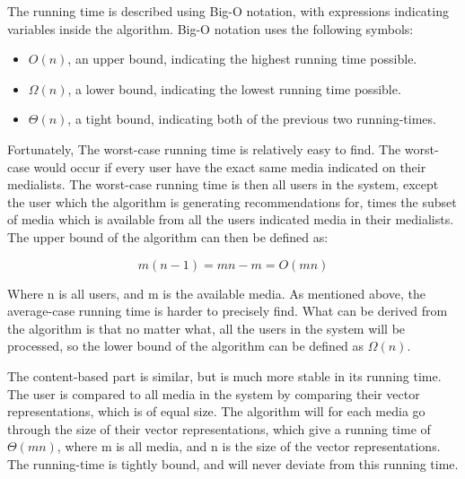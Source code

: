 The running time is described using Big-O notation, with expressions indicating variables inside the algorithm. Big-O notation uses the following symbols:
\begin{itemize}
	\item $O(n)$, an upper bound, indicating the highest running time possible.
	\item $\Omega(n)$, a lower bound, indicating the lowest running time possible.
	\item $\Theta(n)$, a tight bound, indicating both of the previous two running-times.
\end{itemize}

Fortunately, The worst-case running time is relatively easy to find. The worst-case would occur if every user have the exact same media indicated on their medialists. The worst-case running time is then all users in the system, except the user which the algorithm is generating recommendations for, times the subset of media which is available from all the users indicated media in their medialists. The upper bound of the algorithm can then be defined as:

\[
m(n-1) = mn - m = O(mn)
\]

Where n is all users, and m is the available media. As mentioned above, the average-case running time is harder to precisely find. What can be derived from the algorithm is that no matter what, all the users in the system will be processed, so the lower bound of the algorithm can be defined as $\Omega(n)$.

The content-based part is similar, but is much more stable in its running time. The user is compared to all media in the system by comparing their vector representations, which is of equal size. The algorithm will for each media go through the size of their vector representations, which give a running time of $\Theta(mn)$, where m is all media, and n is the size of the vector representations. The running-time is tightly bound, and will never deviate from this running time.